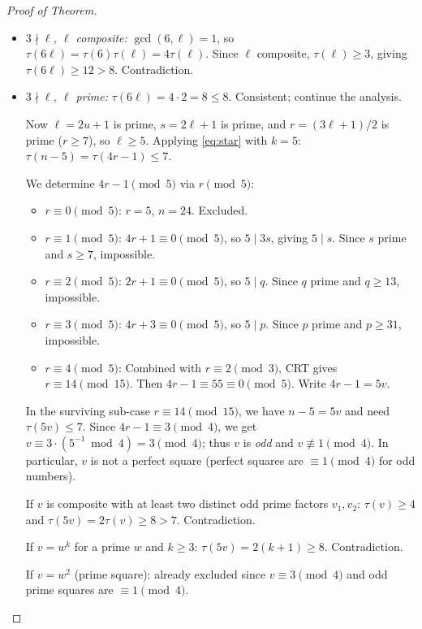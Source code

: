 \documentclass[11pt]{article}
\begin{document}
\begin{proof}[Proof of Theorem]
\begin{itemize}
\begin{itemize}
  \item \emph{$3 \nmid \ell$, $\ell$ composite:}
    $\gcd(6, \ell) = 1$, so $\tau(6\ell) = \tau(6)\tau(\ell) = 4\tau(\ell)$.
    Since $\ell$ composite, $\tau(\ell) \ge 3$, giving
    $\tau(6\ell) \ge 12 > 8$.  Contradiction.

  \item \emph{$3 \nmid \ell$, $\ell$ prime:}
    $\tau(6\ell) = 4 \cdot 2 = 8 \le 8$.  Consistent; continue the analysis.

    Now $\ell = 2u + 1$ is prime, $s = 2\ell + 1$ is prime, and
    $r = (3\ell + 1)/2$ is prime ($r \ge 7$), so $\ell \ge 5$.
    Applying \eqref{eq:star} with $k = 5$:
    $\tau(n - 5) = \tau(4r - 1) \le 7$.

    We determine $4r - 1 \pmod 5$ via $r \pmod 5$:
    \begin{itemize}
    \item $r \equiv 0 \pmod 5$: $r = 5$, $n = 24$.  Excluded.
    \item $r \equiv 1 \pmod 5$: $4r + 1 \equiv 0 \pmod 5$, so $5 \mid 3s$,
      giving $5 \mid s$.  Since $s$ prime and $s \ge 7$, impossible.
    \item $r \equiv 2 \pmod 5$: $2r + 1 \equiv 0 \pmod 5$, so $5 \mid q$.
      Since $q$ prime and $q \ge 13$, impossible.
    \item $r \equiv 3 \pmod 5$: $4r + 3 \equiv 0 \pmod 5$, so $5 \mid p$.
      Since $p$ prime and $p \ge 31$, impossible.
    \item $r \equiv 4 \pmod 5$: Combined with $r \equiv 2 \pmod 3$, CRT gives
      $r \equiv 14 \pmod{15}$.  Then $4r - 1 \equiv 55 \equiv 0 \pmod 5$.
      Write $4r - 1 = 5v$.
    \end{itemize}

    In the surviving sub-case $r \equiv 14 \pmod{15}$, we have $n - 5 = 5v$ and
    need $\tau(5v) \le 7$.  Since $4r - 1 \equiv 3 \pmod 4$, we get
    $v \equiv 3 \cdot (5^{-1} \bmod 4) = 3 \pmod 4$; thus $v$ is \emph{odd} and
    $v \not\equiv 1 \pmod 4$.  In particular, $v$ is not a perfect square
    (perfect squares are $\equiv 1 \pmod 4$ for odd numbers).

    If $v$ is composite with at least two distinct odd prime factors $v_1, v_2$:
    $\tau(v) \ge 4$ and $\tau(5v) = 2\tau(v) \ge 8 > 7$.  Contradiction.

    If $v = w^k$ for a prime $w$ and $k \ge 3$: $\tau(5v) = 2(k+1) \ge 8$.
    Contradiction.

    If $v = w^2$ (prime square): already excluded since $v \equiv 3 \pmod 4$ and
    odd prime squares are $\equiv 1 \pmod 4$.


\end{itemize}
\end{itemize}
\end{proof}
\end{document}
